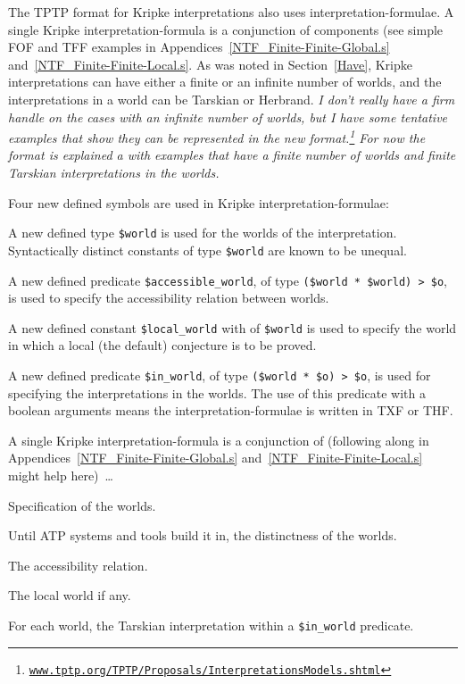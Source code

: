 \documentclass{easychair}
\newenvironment{packed_itemize}{
\vspace*{-0.3em}
\begin{itemize}
\setlength{\partopsep}{0pt}
\setlength{\itemsep}{1pt}
\setlength{\parskip}{0pt}
\setlength{\parsep}{0pt}
}{\end{itemize}}
\begin{document}
The TPTP format for Kripke interpretations also uses interpretation-formulae.
A single Kripke interpretation-formula is a conjunction of components (see simple FOF and TFF 
examples in Appendices~\ref{NTF_Finite-Finite-Global.s} and~\ref{NTF_Finite-Finite-Local.s}.
As was noted in Section~\ref{Have}, Kripke interpretations can have either a finite or an
infinite number of worlds, and the interpretations in a world can be Tarskian or Herbrand.
{\em I don't really have a firm handle on the cases with an infinite number of worlds, but I 
have some tentative examples that show they can be represented in the new format.\footnote{%
\href{https://www.tptp.org/TPTP/Proposals/InterpretationsModels.shtml\#KripkeInfiniteFinite}{{\tt www.tptp.org/TPTP/Proposals/InterpretationsModels.shtml}}}
For now the format is explained a with examples that have a finite number of worlds and finite
Tarskian interpretations in the worlds.}

Four new defined symbols are used in Kripke interpretation-formulae:
\begin{packed_itemize}
\item A new defined type {\tt \$world} is used for the worlds of the interpretation.
      Syntactically distinct constants of type {\tt \$world} are known to be unequal. 
\item A new defined predicate {\tt \$accessible\_world}, of type {\tt (\$world * \$world) > \$o},
      is used to specify the accessibility relation between worlds.
\item A new defined constant {\tt \$local\_world} with of {\tt \$world} is used to specify the
      world in which a local (the default) conjecture is to be proved. 
\item A new defined predicate {\tt \$in\_world}, of type {\tt (\$world * \$o) > \$o}, is used for 
      specifying the interpretations in the worlds.
      The use of this predicate with a boolean arguments means the interpretation-formulae is
      written in TXF or THF.
\end{packed_itemize}

A single Kripke interpretation-formula is a conjunction of (following along in 
Appendices~\ref{NTF_Finite-Finite-Global.s} and~\ref{NTF_Finite-Finite-Local.s} might help 
here)~\ldots
\begin{packed_itemize}
\item Specification of the worlds.
\item Until ATP systems and tools build it in, the distinctness of the worlds.
\item The accessibility relation.
\item The local world if any.
\item For each world, the Tarskian interpretation within a {\tt \$in\_world} predicate.
\end{packed_itemize}
\end{document}

